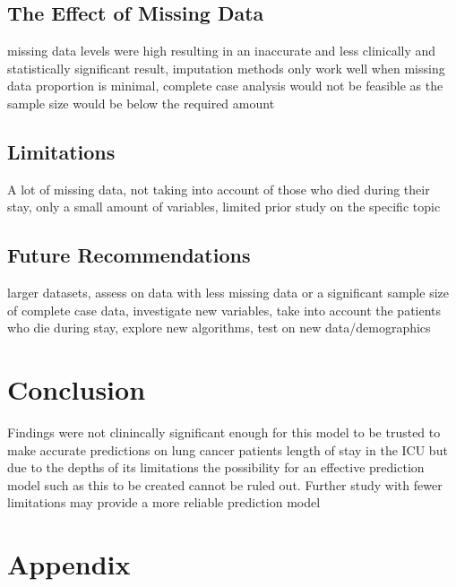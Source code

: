 \documentclass[11pt]{article}
\begin{document}
\subsection{The Effect of Missing Data}
missing data levels were high resulting in an inaccurate and less clinically and statistically significant result, imputation methods only work well when missing data proportion is minimal, complete case analysis would not be feasible as the sample size would be below the required amount

\subsection{Limitations}
A lot of missing data, not taking into account of those who died during their stay, only a small amount of variables, limited prior study on the specific topic

\subsection{Future Recommendations}
larger datasets, assess on data with less missing data or a significant sample size of complete case data, investigate new variables, take into account the patients who die during stay, explore new algorithms, test on new data/demographics

\section{Conclusion}
Findings were not clinincally significant enough for this model to be trusted to make accurate predictions on lung cancer patients length of stay in the ICU but due to the depths of its limitations the possibility for an effective prediction model such as this to be created cannot be ruled out. Further study with fewer limitations may provide a more reliable prediction model

\newpage

\printbibliography

\section*{Appendix}
\end{document}
